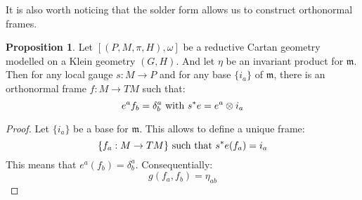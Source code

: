\documentclass[12pt,a4paper]{report}
\theoremstyle{definition}
\theoremstyle{Theorem}
\newtheorem{Prop}[Def]{Proposition}
\theoremstyle{definition}
\theoremstyle{definition}
\begin{document}
	It is also worth noticing that the solder form allows us to construct orthonormal frames.
	\begin{Prop}
		Let $[(P,M,\pi,H),\omega]$ be a reductive Cartan geometry modelled on a Klein geometry $(G,H)$. And let $\eta$ be an invariant product for $\mathfrak{m}$. Then for any local gauge $s:M\rightarrow P$ and for any base $\{i_a\}$ of $\mathfrak{m}$, there is an orthonormal frame $f:M\rightarrow TM$ such that:
		$$e^af_b=\delta^a_b\hbox{ with } s^*e=e^a\otimes i_a$$
	\end{Prop}
	\begin{proof}
		Let $\{i_a\}$ be a base for $\mathfrak{m}$. This allows to define a unique frame:
		$$\{f_a:M\rightarrow TM\} \hbox{ such that }s^*e(f_a)=i_a$$
		This means that $e^a(f_b)=\delta^a_b$. Consequentially:
		$$g(f_a,f_b)=\eta_{ab}$$
	\end{proof}
\end{document}
